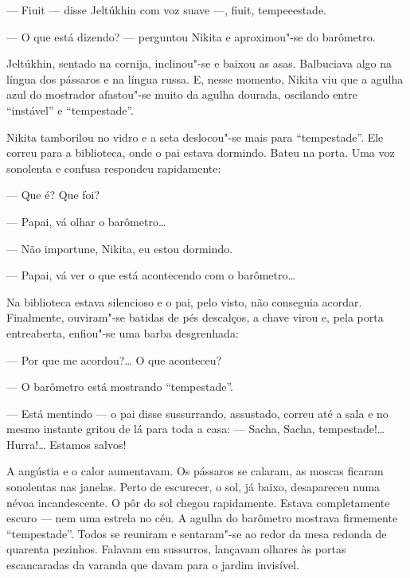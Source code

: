--- Fiuit --- disse Jeltúkhin com voz suave ---, fiuit, tempeeestade.

--- O que está dizendo? --- perguntou Nikita e aproximou"-se do
barômetro.

Jeltúkhin, sentado na cornija, inclinou"-se e baixou as asas. Balbuciava
algo na língua dos pássaros e na língua russa. E, nesse momento, Nikita
viu que a agulha azul do mostrador afastou"-se muito da agulha dourada,
oscilando entre ``instável'' e ``tempestade''.

Nikita tamborilou no vidro e a seta deslocou"-se mais para
``tempestade''. Ele correu para a biblioteca, onde o pai estava
dormindo. Bateu na porta. Uma voz sonolenta e confusa respondeu
rapidamente:

--- Que é? Que foi?

--- Papai, vá olhar o barômetro\ldots{}

--- Não importune, Nikita, eu estou dormindo.

--- Papai, vá ver o que está acontecendo com o barômetro\ldots{}

Na biblioteca estava silencioso e o pai, pelo visto, não conseguia
acordar. Finalmente, ouviram"-se batidas de pés descalços, a chave virou
e, pela porta entreaberta, enfiou"-se uma barba desgrenhada:

--- Por que me acordou?\ldots{} O que aconteceu?

--- O barômetro está mostrando ``tempestade''.

--- Está mentindo --- o pai disse sussurrando, assustado, correu até
a sala e no mesmo instante gritou de lá para toda a casa: ---
Sacha, Sacha, tempestade!\ldots{} Hurra!\ldots{} Estamos salvos!

A angústia e o calor aumentavam. Os pássaros se calaram, as moscas
ficaram sonolentas nas janelas. Perto de escurecer, o sol, já baixo,
desapareceu numa névoa incandescente. O pôr do sol chegou rapidamente.
Estava completamente escuro --- nem uma estrela no céu. A agulha do
barômetro mostrava firmemente ``tempestade''. Todos se reuniram e
sentaram"-se ao redor da mesa redonda de quarenta pezinhos. Falavam em
sussurros, lançavam olhares às portas escancaradas da varanda que davam
para o jardim invisível.

